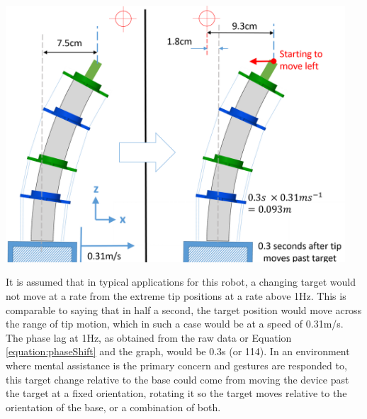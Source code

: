 \documentclass[11pt]{article}
\begin{document}
\begin{center}
\includegraphics[width=0.95\textwidth]{images/baseOvershoot.png}
\label{figure:baseOvershoot}
\end{center}


It is assumed that in typical applications for this robot, a changing target would not move at a rate from the extreme tip positions at a rate above 1Hz. This is comparable to saying that in half a second, the target position would move across the range of tip motion, which in such a case would be at a speed of 0.31m/s. The phase lag at 1Hz, as obtained from the raw data or Equation \ref{equation:phaseShift} and the graph, would be 0.3s (or 114\degree). In an environment where mental assistance is the primary concern and gestures are responded to, this target change relative to the base could come from moving the device past the target at a fixed orientation, rotating it so the target moves relative to the orientation of the base, or a combination of both.
\end{document}
